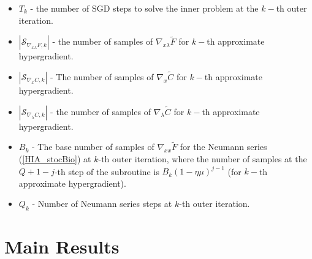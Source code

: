\documentclass[11pt, twoside]{report}
\begin{document}
\begin{itemize}
        \item $T_k$ - the number of SGD steps to solve the inner problem at the $k-$th outer iteration.
        \item $|\mathcal{S}_{\nabla_{x\lambda} F,k}|$ - the number of samples of $\nabla_{x\lambda} \tilde{F}$ for $k-$th approximate hypergradient.
        \item $|\mathcal{S}_{\nabla_x C,k}|$ - The number of samples of $\nabla_x \tilde{C}$ for $k-$th approximate hypergradient.
        \item $|\mathcal{S}_{\nabla_\lambda C,k}|$ - the number of samples of $\nabla_\lambda \tilde{C}$ for $k-$th approximate hypergradient.
        \item $B_k$ - The base number of samples of $\nabla_{xx} \tilde{F}$ for the Neumann series (\ref{HIA_stocBio}) at $k$-th outer iteration, where the number of samples at the $Q+1-j$-th step of the subroutine is $B_k(1-\eta\mu)^{j-1}$ (for $k-$th approximate hypergradient).
        \item $Q_k$ - Number of Neumann series steps at $k$-th outer iteration.
    \end{itemize}

\begin{algorithm}[]
\caption{Stochastic HOAG}
\label{alg:hoag}
\DontPrintSemicolon
{}
\end{algorithm}


\section{Main Results}
\end{document}
